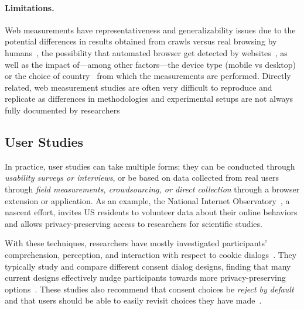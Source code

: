 \paragraph{Limitations.} Web measurements have representativeness and generalizability issues due to the potential differences in results obtained from crawls versus real browsing by humans~\cite{zeberRepresentativenessAutomatedWeb2020}, the possibility that automated browser get detected by websites~\cite{krumnowHowGullibleAre2022}, as well as the impact of---among other factors---the device type (mobile vs desktop)~\cite{yangComparativeMeasurementStudy2020,casselOmniCrawlComprehensiveMeasurement2022} or the choice of country~\cite{samarasingheGlobalPerspectiveWeb2019} from which the measurements are performed. Directly related, web measurement studies are often very difficult to reproduce and replicate as differences in methodologies and experimental setups are not always fully documented by researchers~\cite{demirReproducibilityReplicabilityWeb2022,hantkeWebExecutionBundles2025}


\subsection{User Studies}
\label{sec:user-studies}

In practice, user studies can take multiple forms; they can be conducted through \textit{usability surveys or interviews}, or be based on data collected from real users through \textit{field measurements, crowdsourcing, or direct collection} through a browser extension or application. As an example, the National Internet Observatory~\cite{steningUnprecedentedDataCollection2022,nioNationalInternetObservatory,callahanCanWeBetter2021,fealIntroductionNationalInternet2024}, a nascent effort, invites US residents to volunteer data about their online behaviors and allows privacy-preserving access to researchers for scientific studies. 


With these techniques, researchers have mostly investigated participants’ comprehension, perception, and interaction with respect to cookie  dialogs~\cite{birrellSoKTechnicalImplementation2024,machuletzMultiplePurposesMultiple2020,bermejofernandezThisWebsiteUses2021,habibOkayWhateverEvaluation2022,singhWhatCookieConsent2022,bielovaSurveyAcademicStudies2022,Bielova2024-zr}. They typically study and compare different consent dialog designs, finding that many current designs effectively nudge participants towards more privacy-preserving options~\cite{machuletzMultiplePurposesMultiple2020,bermejofernandezThisWebsiteUses2021}. These studies also recommend that consent choices be \textit{reject by default} and that users should be able to easily revisit choices they have made~\cite{habibOkayWhateverEvaluation2022,Kanc-etal-25-PETs}.
